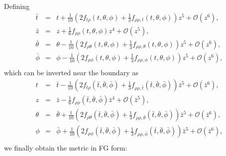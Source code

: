 \documentclass[aps,letterpaper,twocolumn,nofootinbib]{revtex4}
\numberwithin{equation}{section}
\begin{document}
Defining 
\begin{eqnarray}
\label{eqn:FGcoords}
\bar{t}&=&t+\frac{1}{10 } \left(2 f_{t\rho}(t,\theta,\phi)+\frac{1}{3}f_{\rho\rho,t}(t,\theta,\phi)\right)z^5+\mathcal{O}(z^6),\nonumber \\
\bar{z}&=&z+\frac{1}{6}f_{\rho\rho}(t,\theta,\phi)z^4+\mathcal{O}(z^5),\nonumber \\
\bar{\theta}&=&\theta-\frac{1}{10} \left(2 f_{\rho\theta}(t,\theta,\phi)+\frac{1}{3}f_{\rho\rho,\theta}(t,\theta,\phi)\right)z^5+\mathcal{O}(z^6),\nonumber \\
\bar{\phi}&=&\phi-\frac{1}{10} \left(2 f_{\rho\phi}(t,\theta,\phi)+\frac{1}{3}f_{\rho\rho,\phi}(t,\theta,\phi)\right)z^5+\mathcal{O}(z^6),\nonumber \\
\end{eqnarray}
which can be inverted near the boundary as
\begin{eqnarray}
\label{eqn:invertFGcoords}
t&=&\bar{t}-\frac{1}{10} \left(2 f_{t\rho}(\bar{t},\bar{\theta},\bar{\phi})+\frac{1}{3}f_{\rho\rho,\bar{t}}(\bar{t},\bar{\theta},\bar{\phi})\right)\bar{z}^5+\mathcal{O}(\bar{z}^6),\nonumber \\
z&=&\bar{z}-\frac{1}{6}f_{\rho\rho}(\bar{t},\bar{\theta},\bar{\phi})\bar{z}^4+\mathcal{O}(\bar{z}^5),\nonumber \\
\theta&=&\bar{\theta}+\frac{1}{10} \left(2 f_{\rho\theta}(\bar{t},\bar{\theta},\bar{\phi})+\frac{1}{3}f_{\rho\rho,\bar{\theta}}(\bar{t},\bar{\theta},\bar{\phi})\right)\bar{z}^5+\mathcal{O}(\bar{z}^6),\nonumber \\
\phi&=&\bar{\phi}+\frac{1}{10} \left(2 f_{\rho\phi}(\bar{t},\bar{\theta},\bar{\phi})+\frac{1}{3}f_{\rho\rho,\bar{\phi}}(\bar{t},\bar{\theta},\bar{\phi})\right)\bar{z}^5+\mathcal{O}(\bar{z}^6),\nonumber \\
\end{eqnarray}
we finally obtain the metric in FG form:
\end{document}
